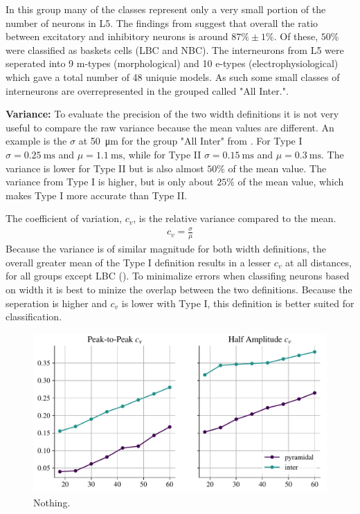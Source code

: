 \documentclass[altfont, fleqn]{uiophd}
\renewcommand{\cref}[1]{{\color{viridis_03}\mycref{#1}}}
\begin{document}
In this group many of the classes represent only
a very small portion of the number of neurons in L5. 
The findings from 
\textcite{markram_reconstruction_2015} 
suggest
that overall the ratio between excitatory
and inhibitory neurons is around $87\% \pm 1\%$. 
Of these, $50\%$ were classified as 
baskets cells (LBC and NBC).
The interneurons from L5 were seperated into 
9 m-types (morphological) and 10 e-types (electrophysiological)
which gave a total number
of 48 uniquie models.
As such some small classes of 
interneurons are overrepresented in the grouped called "All Inter.".
\newline



\noindent
\textbf{Variance:}
To evaluate the precision of the two width definitions
it is not very useful to compare the raw variance because 
the mean values are different.
An example is the $\sigma$ at 
\SI{50}{\micro\metre}
for the group "All Inter" from \cref{fig:4_2_width}.
For Type I 
$\sigma = \SI{0.25}{\milli\second}$ 
and 
$\mu = \SI{1.1}{\milli\second}$, 
while for Type II 
$\sigma = \SI{0.15}{\milli\second}$ 
and 
$\mu = \SI{0.3}{\milli\second}$. 
The variance is lower for Type II but is also
almost $50\%$ of the mean value. 
The variance from Type I is higher, but is only about 
$25\%$ of the mean value, 
which makes Type I more accurate than Type II.

The coefficient of variation, $c_v$,
is the relative variance compared to the mean.
\begin{align}
    c_v = \frac{\sigma}{\mu}
\end{align}
Because the variance is of similar magnitude for both width definitions, 
the overall greater mean of the Type I definition results in a
lesser $c_v$ at all distances, for all groups except LBC
(\cref{fig:4_width_snr}).
To minimalize errors when classifing neurons based on width 
it is best to minize the overlap between the two definitions.
Because the seperation is higher and $c_v$ is lower with Type I,
this definition is better suited for classification.

\begin{figure}[h]
    \begin{center}
        \includegraphics[width=\textwidth]{images/sec_4/int_pyr_widths_snr.pdf}
        \caption{
            Nothing.
        }
        \label{fig:4_width_snr}
    \end{center}
\end{figure}
\end{document}
